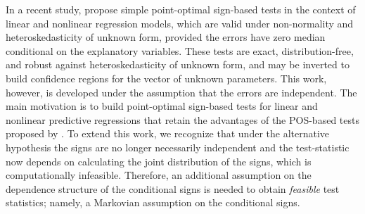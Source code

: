 \documentclass[harvard,11pt]{article}
\begin{document}


In a recent study, \citet{dufour2010exact} propose simple
point-optimal sign-based tests in the context of linear and nonlinear regression models,
which are valid under non-normality and hetero\-skedasticity of unknown form,
provided the errors have zero median conditional on the explanatory
variables. These tests are exact, distribution-free, and robust against
hetero\-skedasticity of unknown form, and may be inverted to build confidence
regions for the vector of unknown parameters. This work, however, is
developed under the assumption that the errors are independent. The
main motivation is to build point-optimal sign-based tests for linear and
nonlinear predictive regressions that retain the advantages of the POS-based tests proposed by \citet{dufour2010exact}. To extend this work, we recognize that under the alternative hypothesis the signs are no longer necessarily independent and the test-statistic now depends on calculating the joint distribution of the signs, which is computationally infeasible. Therefore, an additional
assumption on the dependence structure of the conditional signs is needed to obtain \textit{feasible} test
statistics; namely, a Markovian assumption on the conditional signs. 
\end{document}
